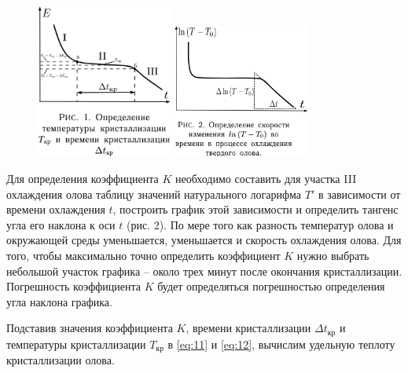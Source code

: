 \documentclass[a4paper]{article}
\begin{document}
\begin{figure}[htbp]
    \centering
    \includegraphics[width=0.4\textwidth]{pick_1} %
    \includegraphics[width=0.4\textwidth]{pick_2} %
\end{figure}

%

Для определения коэффициента $K$ необходимо составить для участка III охлаждения олова таблицу значений натурального логарифма $T'$ в зависимости от времени охлаждения $t$, построить график этой зависимости и определить тангенс угла его наклона к оси $t$ (рис. 2). По мере того как разность температур олова и окружающей среды уменьшается, уменьшается и скорость охлаждения олова. Для того, чтобы максимально точно определить коэффициент $K$ нужно выбрать небольшой участок графика – около трех минут после окончания кристаллизации. Погрешность коэффициента $K$ будет определяться погрешностью определения угла наклона графика.

Подставив значения коэффициента $K$, времени кристаллизации $\Delta t_{\text{кр}}$ и температуры кристаллизации $T_{\text{кр}}$ в \eqref{eq:11} и \eqref{eq:12}, вычислим удельную теплоту кристаллизации олова.
\end{document}
